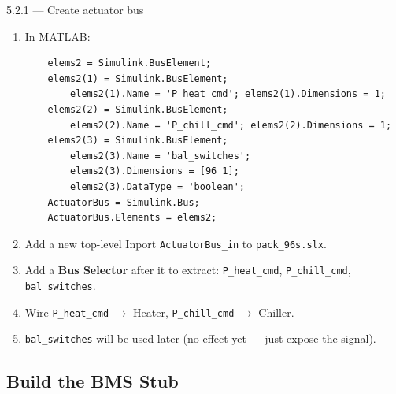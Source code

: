 \documentclass[11pt,a4paper]{article}
\begin{document}
\begin{guistep}{5.2.1 — Create actuator bus}
\begin{enumerate}
    \item In MATLAB:
    \begin{verbatim}
    elems2 = Simulink.BusElement;
    elems2(1) = Simulink.BusElement;
        elems2(1).Name = 'P_heat_cmd'; elems2(1).Dimensions = 1;
    elems2(2) = Simulink.BusElement;
        elems2(2).Name = 'P_chill_cmd'; elems2(2).Dimensions = 1;
    elems2(3) = Simulink.BusElement;
        elems2(3).Name = 'bal_switches';
        elems2(3).Dimensions = [96 1];
        elems2(3).DataType = 'boolean';
    ActuatorBus = Simulink.Bus;
    ActuatorBus.Elements = elems2;
    \end{verbatim}
    \item Add a new top-level Inport \texttt{ActuatorBus\_in} to \texttt{pack\_96s.slx}.
    \item Add a \textbf{Bus Selector} after it to extract: \texttt{P\_heat\_cmd}, \texttt{P\_chill\_cmd}, \texttt{bal\_switches}.
    \item Wire \texttt{P\_heat\_cmd} $\to$ Heater, \texttt{P\_chill\_cmd} $\to$ Chiller.
    \item \texttt{bal\_switches} will be used later (no effect yet — just expose the signal).
\end{enumerate}
\end{guistep}

\subsection{Build the BMS Stub}
\end{document}
